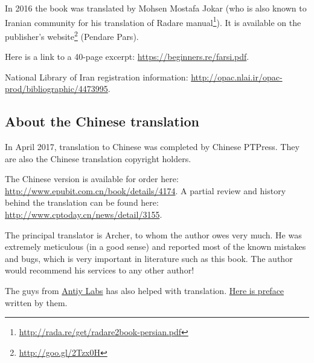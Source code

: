 In 2016 the book was translated by Mohsen Mostafa Jokar (who is also known to Iranian community for his translation of Radare manual\footnote{\url{http://rada.re/get/radare2book-persian.pdf}}).
It is available on the publisher’s website\footnote{\url{http://goo.gl/2Tzx0H}} (Pendare Pars).

Here is a link to a 40-page excerpt: \url{https://beginners.re/farsi.pdf}.

National Library of Iran registration information: \url{http://opac.nlai.ir/opac-prod/bibliographic/4473995}.

\subsection*{About the Chinese translation}

In April 2017, translation to Chinese was completed by Chinese PTPress. They are also the Chinese translation copyright holders.

 The Chinese version is available for order here: \url{http://www.epubit.com.cn/book/details/4174}. A partial review and history behind the translation can be found here: \url{http://www.cptoday.cn/news/detail/3155}.

The principal translator is Archer, to whom the author owes very much. He was extremely meticulous (in a good sense) and reported most of the known mistakes and bugs, which is very important in literature such as this book.
The author would recommend his services to any other author!

The guys from \href{http://www.antiy.net/}{Antiy Labs} has also helped with translation. \href{http://www.epubit.com.cn/book/onlinechapter/51413}{Here is preface} written by them.
